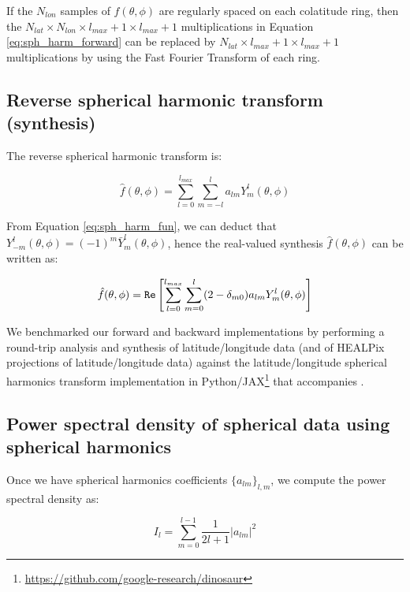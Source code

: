 \documentclass[11pt, a4paper, logo, copyright, numbering]{googledeepmind}
\begin{document}
If the $N_{lon}$ samples of $f(\theta,\phi)$ are regularly spaced on each colatitude ring, then the $N_{lat} \times N_{lon} \times {l_{max}+1} \times {l_{max}+1}$ multiplications in Equation \ref{eq:sph_harm_forward} can be replaced by $N_{lat} \times {l_{max}+1} \times {l_{max}+1}$ multiplications by using the Fast Fourier Transform of each ring.

\subsection{Reverse spherical harmonic transform (synthesis)}

The reverse spherical harmonic transform is:

\begin{equation}
\hat f(\theta, \phi) = \sum_{l=0}^{l_{max}}\sum_{m=-l}^l a_{lm}Y_m^l(\theta, \phi)
\label{eq:sph_harm_backward}
\end{equation}

From Equation \ref{eq:sph_harm_fun}, we can deduct that $Y_{-m}^l(\theta, \phi) = (-1)^m \bar{Y}_m^l(\theta, \phi)$, hence the real-valued synthesis $\hat f(\theta, \phi)$ can be written as:

\begin{equation}
\hat f(\theta, \phi) = {\tt Re} \left [ \sum_{l=0}^{l_{max}}\sum_{m=0}^l (2 - \delta_{m0}) a_{lm}Y_m^l(\theta, \phi) \right ]
\label{eq:sph_harm_backward_real}
\end{equation}


We benchmarked our forward and backward implementations by performing a round-trip analysis and synthesis of latitude/longitude data (and of HEALPix projections of latitude/longitude data) against the latitude/longitude spherical harmonics transform implementation in Python/JAX\footnote{\url{https://github.com/google-research/dinosaur}} that accompanies \citep{hoyer2023neural}.

\subsection{Power spectral density of spherical data using spherical harmonics}

Once we have spherical harmonics coefficients $\{a_{lm}\}_{l,m}$, we compute the power spectral density as:

\begin{equation}
I_l = \sum _{m=0}^{l-1} \frac{1}{2l + 1} | a_{lm} |^2
\end{equation}
\end{document}
